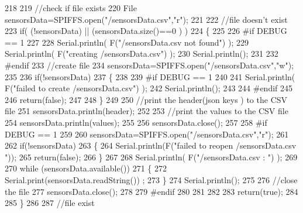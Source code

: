 \begin{DoxyCode}
218 
219     \textcolor{comment}{//check if file exists}
220     File sensorsData=SPIFFS.open(\textcolor{stringliteral}{"/sensorsData.csv"},\textcolor{stringliteral}{"r"});
221     
222     \textcolor{comment}{//file doesn't exist}
223     \textcolor{keywordflow}{if}( (!sensorsData) || (sensorsData.size()==0 ) )
224     \{
225     
226 \textcolor{preprocessor}{    #if DEBUG == 1}
227     
228         Serial.println( F(\textcolor{stringliteral}{"/sensorsData.csv not found"}) );
229         Serial.println( F(\textcolor{stringliteral}{"creating /sensorsData.csv"}) );
230         Serial.println();
231     
232 \textcolor{preprocessor}{    #endif}
233         \textcolor{comment}{//create file}
234         sensorsData=SPIFFS.open(\textcolor{stringliteral}{"/sensorsData.csv"},\textcolor{stringliteral}{"w"});
235         
236         \textcolor{keywordflow}{if}(!sensorsData)
237         \{
238 
239 \textcolor{preprocessor}{        #if DEBUG == 1}
240         
241             Serial.println( F(\textcolor{stringliteral}{"failed to create /sensorsData.csv"}) );
242             Serial.println();
243         
244 \textcolor{preprocessor}{        #endif}
245         
246             \textcolor{keywordflow}{return}(\textcolor{keyword}{false});
247 
248         \}
249         
250         \textcolor{comment}{//print the header(json keys ) to the CSV file}
251         sensorsData.println(header);
252 
253         \textcolor{comment}{//print the values to the CSV file}
254         sensorsData.println(values);
255         
256         sensorsData.close();
257     
258 \textcolor{preprocessor}{    #if DEBUG == 1}
259 
260         sensorsData=SPIFFS.open(\textcolor{stringliteral}{"/sensorsData.csv"},\textcolor{stringliteral}{"r"});
261         
262         \textcolor{keywordflow}{if}(!sensorsData)
263         \{
264             Serial.println(F(\textcolor{stringliteral}{"failed to reopen /sensorsData.csv "}));
265             \textcolor{keywordflow}{return}(\textcolor{keyword}{false});      
266         \}
267 
268         Serial.println( F(\textcolor{stringliteral}{"/sensorsData.csv : "}) );
269 
270         \textcolor{keywordflow}{while} (sensorsData.available()) 
271         \{
272             Serial.print(sensorsData.readString()) ;
273         \}
274         Serial.println();
275 
276         \textcolor{comment}{//close the file}
277         sensorsData.close();
278 
279 \textcolor{preprocessor}{    #endif}
280         
281 
282         
283         \textcolor{keywordflow}{return}(\textcolor{keyword}{true});
284         
285     \}
286 
287     \textcolor{comment}{//file exist}

\end{DoxyCode}
